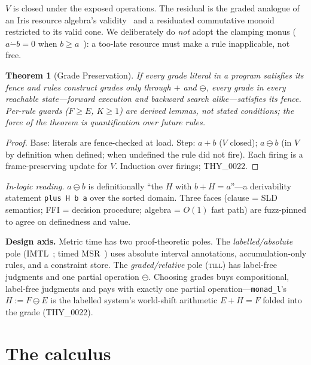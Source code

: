 \documentclass[11pt]{article}
\newcommand{\res}{\mathbin{\ominus}}             %
\newcommand{\till}{\textsc{till}}                %
\newtheorem{theorem}{Theorem}[section]
\theoremstyle{definition}
\theoremstyle{remark}
\begin{document}
$V$ is closed under the exposed operations.  The residual is the graded analogue
of an Iris resource algebra's validity~\cite{JungIris2018} and a residuated
commutative monoid~\cite{Galatos2007} restricted to its valid cone.  We
deliberately do \emph{not} adopt the clamping monus ($a \mathbin{\dot{-}} b = 0$
when $b \geq a$~\cite{Amer1984}): a too-late resource must make a rule
inapplicable, not free.

\begin{theorem}[Grade Preservation]
\label{thm:grade-pres}
If every grade literal in a program satisfies its fence and rules construct grades
only through $+$ and $\res$, every grade in every reachable state---forward
execution and backward search alike---satisfies its fence.  Per-rule guards
($F \geq E$, $K \geq 1$) are derived lemmas, not stated conditions; the force of
the theorem is quantification over \emph{future} rules.
\end{theorem}
\begin{proof}
Base: literals are fence-checked at load.  Step: $a + b$ ($V$ closed); $a \res b$
(in $V$ by definition when defined; when undefined the rule did not fire).  Each
firing is a frame-preserving update for $V$.  Induction over firings; THY\_0022.
\end{proof}

\noindent\textit{In-logic reading.}  $a \res b$ is definitionally ``the $H$ with
$b + H = a$''---a derivability statement \texttt{plus H b a} over the sorted
domain.  Three faces (clause = SLD semantics; FFI = decision procedure; algebra =
$O(1)$ fast path) are fuzz-pinned to agree on definedness and value.

\medskip
\noindent\textbf{Design axis.}  Metric time has two proof-theoretic poles.  The
\emph{labelled/absolute} pole (IMTL~\cite{deSaToninhoPfenning2023}; timed
MSR~\cite{KanovichFORMATS2016}) uses absolute interval annotations, accumulation-only
rules, and a constraint store.  The \emph{graded/relative} pole (\till{}) has
label-free judgments and one partial operation $\res$.  Choosing grades buys
compositional, label-free judgments and pays with exactly one partial
operation---\texttt{monad\_l}'s $H := F \res E$ is the labelled system's
world-shift arithmetic $E + H = F$ folded into the grade (THY\_0022).

\section{The calculus}
\label{sec:calculus}
\end{document}
